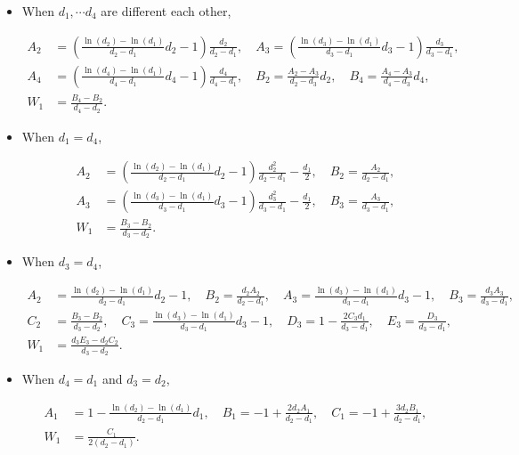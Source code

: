 \documentclass[12pt]{article}
\begin{document}
\begin{itemize}

\item When $d_1, \cdots d_4$ are different each other,

\begin{align}
A_2 &= \left(\frac{\ln(d_2) - \ln(d_1)}{d_2 - d_1} d_2 - 1 \right) \frac{d_2}{d_2 - d_1},
\quad
A_3 = \left(\frac{\ln(d_3) - \ln(d_1)}{d_3 - d_1} d_3 - 1 \right) \frac{d_3}{d_3 - d_1},
\nonumber \\
A_4 &= \left(\frac{\ln(d_4) - \ln(d_1)}{d_4 - d_1} d_4 - 1 \right) \frac{d_4}{d_4 - d_1},
\quad
B_2 = \frac{A_2 - A_3}{d_2 - d_3} d_2,
\quad
B_4 = \frac{A_4 - A_3}{d_4 - d_3} d_4,
\nonumber \\
W_1 &= \frac{B_4 - B_2}{d_4 - d_2}.
\end{align}

\item When $d_1 = d_4$, 

\begin{align}
A_2 &= \left(\frac{\ln(d_2) - \ln(d_1)}{d_2 - d_1} d_2 - 1 \right) \frac{d_2^2}{d_2 - d_1} - \frac{d_1}{2},
\quad
B_2 = \frac{A_2}{d_2 - d_1},
\nonumber \\
A_3 &= \left(\frac{\ln(d_3) - \ln(d_1)}{d_3 - d_1} d_3 - 1 \right) \frac{d_3^2}{d_3 - d_1} - \frac{d_1}{2},
\quad
B_3 = \frac{A_3}{d_3 - d_1},
\nonumber \\
W_1 &= \frac{B_3 - B_2}{d_3 - d_2}.
\end{align}

\item When $d_3 = d_4$,

\begin{align}
A_2 &= \frac{\ln(d_2) - \ln(d_1)}{d_2 - d_1} d_2 - 1 ,
\quad
B_2 = \frac{d_2 A_2}{d_2 - d_1},
\quad
A_3 = \frac{\ln(d_3) - \ln(d_1)}{d_3 - d_1} d_3 - 1 ,
\quad
B_3 = \frac{d_3 A_3}{d_3 - d_1},
\nonumber \\
C_2 &= \frac{B_3 - B_2}{d_3 - d_2},
\quad
C_3 = \frac{\ln(d_3) - \ln(d_1)}{d_3 - d_1} d_3 - 1 ,
\quad
D_3 = 1 - \frac{2  C_3 d_1}{d_3 - d_1},
\quad
E_3 = \frac{D_3}{d_3 - d_1},
\nonumber \\
W_1 &= \frac{d_3 E_3 - d_2 C_2}{d_3 - d_2}.
\end{align}

\item When $d_4 = d_1$ and $d_3 = d_2$,

\begin{align}
A_1 &= 1 - \frac{\ln(d_2) - \ln(d_1)}{d_2 - d_1} d_1,
\quad
B_1 = -1 + \frac{2 d_2 A_1}{d_2 - d_1},
\quad
C_1 = -1 + \frac{3 d_2 B_1}{d_2 - d_1},
\nonumber \\
W_1 &= \frac{C_1}{2 (d_2 - d_1)}.
\end{align}


\end{itemize}
\end{document}
